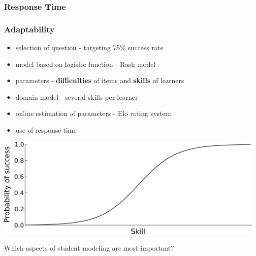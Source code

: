 \documentclass[xcolor=svgnames]{beamer}
\begin{document}
\begin{frame}
    \frametitle{Response Time}

    \huge


\end{frame}
\begin{frame}
    \frametitle{Adaptability}
    \begin{itemize}
        \item selection of question - targeting 75\% success rate
        \item model based on logistic function - Rash model
        \item parameters - \textbf{difficulties} of items and \textbf{skills} of learners
        \item domain model - several skills per learner
        \item online estimation of parameters - Elo rating system
        \item use of response time
    \end{itemize}

    \vfill

    \centering
    \includegraphics[width=0.6\linewidth]{figures/logistic}
\end{frame}
\begin{frame}
    \centering

    \huge
    Which aspects of student modeling are most important?

\end{frame}
\end{document}
